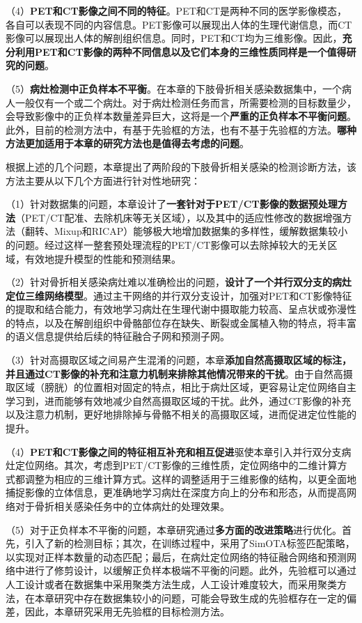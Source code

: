 （4）\textbf{PET和CT影像之间不同的特征}。PET和CT是两种不同的医学影像模态，各自可以表现不同的内容信息。PET影像可以展现出人体的生理代谢信息，而CT影像可以展现出人体的解剖组织信息。同时，PET和CT均为三维影像。因此，\textbf{充分利用PET和CT影像的两种不同信息以及它们本身的三维性质同样是一个值得研究的问题}。

（5）\textbf{病灶检测中正负样本不平衡}。在本章的下肢骨折相关感染数据集中，一个病人一般仅有一个或二个病灶。对于病灶检测任务而言，所需要检测的目标数量少，会导致影像中的正负样本数量差异巨大，这将是一个\textbf{严重的正负样本不平衡问题}。此外，目前的检测方法中，有基于先验框的方法，也有不基于先验框的方法。\textbf{哪种方法更加适用于本章的研究方法也是值得去考虑的问题}。

根据上述的几个问题，本章提出了两阶段的下肢骨折相关感染的检测诊断方法，该方法主要从以下几个方面进行针对性地研究：

（1）针对数据集的问题，本章设计了\textbf{一套针对于PET/CT影像的数据预处理方法}（PET/CT配准、去除机床等无关区域），以及其中的适应性修改的数据增强方法（翻转、Mixup\cite{zhang2017mixup}和RICAP\cite{takahashi2018ricap}）能够极大地增加数据集的多样性，缓解数据集较小的问题。经过这样一整套预处理流程的PET/CT影像可以去除掉较大的无关区域，有效地提升模型的性能和预测结果。

（2）针对骨折相关感染病灶难以准确检出的问题，\textbf{设计了一个并行双分支的病灶定位三维网络模型}。通过主干网络的并行双分支设计，加强对PET和CT影像特征的提取和结合能力，有效地学习病灶在生理代谢中摄取能力较高、呈点状或弥漫性的特点，以及在解剖组织中骨骼部位存在缺失、断裂或金属植入物的特点，将丰富的语义信息提供给后续的特征融合子网和预测子网。

（3）针对高摄取区域之间易产生混淆的问题，本章\textbf{添加自然高摄取区域的标注，并且通过CT影像的补充和注意力机制来排除其他情况带来的干扰}。由于自然高摄取区域（膀胱）的位置相对固定的特点，相比于病灶区域，更容易让定位网络自主学习到，进而能够有效地减少自然高摄取区域的干扰。此外，通过CT影像的补充以及注意力机制，更好地排除掉与骨骼不相关的高摄取区域，进而促进定位性能的提升。

（4）\textbf{PET和CT影像之间的特征相互补充和相互促进}驱使本章引入并行双分支病灶定位网络。其次，考虑到PET/CT影像的三维性质，定位网络中的二维计算方式都调整为相应的三维计算方式。这样的调整适用于三维影像的结构，以更全面地捕捉影像的立体信息，更准确地学习病灶在深度方向上的分布和形态，从而提高网络对于骨折相关感染任务中的立体病灶的处理效果。

（5）对于正负样本不平衡的问题，本章研究通过\textbf{多方面的改进策略}进行优化。首先，引入了新的检测目标；其次，在训练过程中，采用了SimOTA标签匹配策略，以实现对正样本数量的动态匹配；最后，在病灶定位网络的特征融合网络和预测网络中进行了修剪设计，以缓解正负样本极端不平衡的问题。此外，先验框可以通过人工设计或者在数据集中采用聚类方法生成，人工设计难度较大，而采用聚类方法，在本章研究中存在数据集较小的问题，可能会导致生成的先验框存在一定的偏差，因此，本章研究采用无先验框的目标检测方法。

